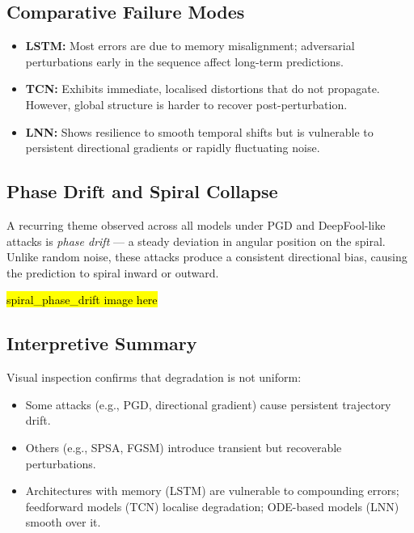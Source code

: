 \subsection{Comparative Failure Modes}

\begin{itemize}
    \item \textbf{LSTM:} Most errors are due to memory misalignment; adversarial perturbations early in the sequence affect long-term predictions.
    \item \textbf{TCN:} Exhibits immediate, localised distortions that do not propagate. However, global structure is harder to recover post-perturbation.
    \item \textbf{LNN:} Shows resilience to smooth temporal shifts but is vulnerable to persistent directional gradients or rapidly fluctuating noise.
\end{itemize}

\subsection{Phase Drift and Spiral Collapse}

A recurring theme observed across all models under PGD and DeepFool-like attacks is \emph{phase drift} — a steady deviation in angular position on the spiral. Unlike random noise, these attacks produce a consistent directional bias, causing the prediction to spiral inward or outward.

\hl{spiral\_phase\_drift image here}


\subsection{Interpretive Summary}

Visual inspection confirms that degradation is not uniform:
\begin{itemize}
    \item Some attacks (e.g., PGD, directional gradient) cause persistent trajectory drift.
    \item Others (e.g., SPSA, FGSM) introduce transient but recoverable perturbations.
    \item Architectures with memory (LSTM) are vulnerable to compounding errors; feedforward models (TCN) localise degradation; ODE-based models (LNN) smooth over it.
\end{itemize}

